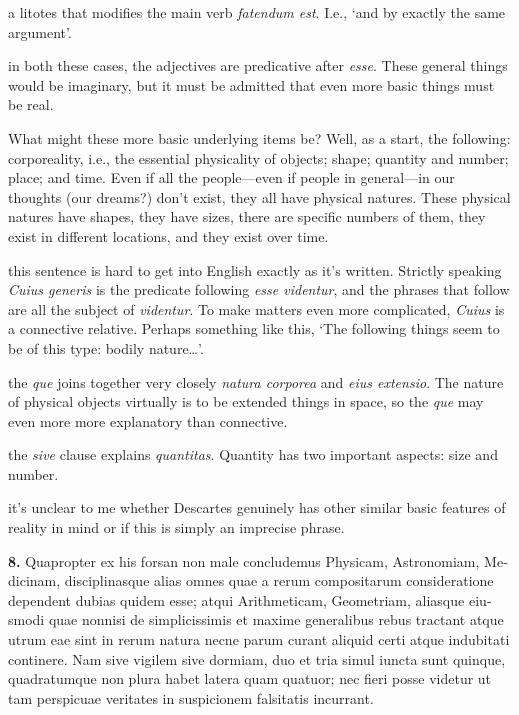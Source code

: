  a litotes that modifies the main verb \textit{fatendum est}. I.e., `and by exactly the same argument'.

 in both these cases, the adjectives are predicative after \textit{esse}. These general things would be imaginary, but it must be admitted that even more basic things must be real.

What might these more basic underlying items be? Well, as a start, the following: corporeality, i.e., the essential physicality of objects; shape; quantity and number; place; and time. Even if all the people---even if people in general---in our thoughts (our dreams?) don't exist, they all have physical natures. These physical natures have shapes, they have sizes, there are specific numbers of them, they exist in different locations, and they exist over time.

 this sentence is hard to get into English exactly as it's written. Strictly speaking \textit{Cuius generis} is the predicate following \textit{esse videntur}, and the phrases that follow are all the subject of \textit{videntur}. To make matters even more complicated, \textit{Cuius} is a connective relative. Perhaps something like this, `The following things seem to be of this type: bodily nature\dots'.

 the \textit{que} joins together very closely \textit{natura corporea} and \textit{eius extensio}. The nature of physical objects virtually is to be extended things in space, so the \textit{que} may even more more explanatory than connective.

 the \textit{sive} clause explains \textit{quantitas}. Quantity has two important aspects: size and number.

 it's unclear to me whether Descartes genuinely has other similar basic features of reality in mind or if this is simply an imprecise phrase.

\clearpage

\beginnumbering
\pstart
\begin{latin}
    \textenglish{\textbf{8.}} Quapropter ex his forsan non male concludemus Physicam, Astronomiam, Medicinam, disciplinasque alias omnes quae a rerum compositarum consideratione dependent dubias quidem esse; atqui Arithmeticam, Geometriam, aliasque eiusmodi quae nonnisi de simplicissimis et maxime generalibus rebus tractant atque utrum eae sint in rerum natura necne parum curant aliquid certi atque indubitati continere. Nam sive vigilem sive dormiam, duo et tria simul iuncta sunt quinque, quadratumque non plura habet latera quam quatuor; nec fieri posse videtur ut tam perspicuae veritates in suspicionem falsitatis incurrant.
\end{latin}
\pend
\endnumbering

